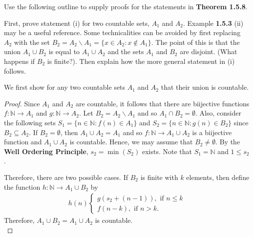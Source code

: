 \documentclass[12pt]{article}
\newcommand{\N}{\mathbb{N}}
\newenvironment{problem}[2][Problem]{\begin{trivlist}
		\item[\hskip \labelsep {\bfseries #1}\hskip \labelsep {\bfseries #2.}]}{\end{trivlist}}
\newenvironment{solution}[2][Solution]{\begin{trivlist}
		\item[\hskip \labelsep {\bfseries #1}\hskip \labelsep {\bfseries #2.}]}{\end{trivlist}}
\begin{document}
	\begin{problem}{1.5.3}
		Use the following outline to supply proofs for the statements in \textbf{Theorem 1.5.8}.
		\begin{enumerate}[label=(\alph*)]
			\item First, prove statement (i) for two countable sets, $A_{1}$ and $A_{2}$. Example \textbf{1.5.3} (ii) may be a useful reference. Some technicalities can be avoided by first replacing $A_{2}$ with the set $B_{2} =A_{2}\backslash A_{1} = \{x\in A_{2}:x\not\in A_{1}\}$. The point of this is that the union $A_{1}\cup B_{2}$ is equal to $A_{1}\cup A_{2}$ and the sets $A_{1}$ and $B_{2}$ are disjoint. (What happens if $B_{2}$ is finite?). Then explain how the more general statement in (i) follows.
			\begin{solution}{(a)}
				We first show for any two countable sets $A_{1}$ and $A_{2}$ that their union is countable.
				\begin{proof}
					Since $A_{1}$ and $A_{2}$ are countable, it follows that there are biijective functions $f:\N \to A_{1}$ and $g:\N \to A_{2}$. Let $B_{2} = A_{2}\backslash A_{1}$ and so $A_{1}\cap B_{2} = \emptyset$. Also, consider the following sets $S_{1} = \{n\in \N: f(n)\in A_{1}\}$ and $S_{2} = \{n\in \N: g(n) \in B_{2}\}$ since $B_{2} \subseteq A_{2}$. If $B_{2} = \emptyset$, then $A_{1}\cup A_{2} = A_{1}$ and so $f:\N \to A_{1}\cup A_{2}$ is a biijective function and $A_{1}\cup A_{2}$ is countable. Hence, we may assume that $B_{2}\neq \emptyset$. By the \textbf{Well Ordering Principle}, $s_{2} = \min (S_{2})$ exists. Note that $S_{1} = \N$ and $1\leq s_{2}$.
					
					Therefore, there are two possible cases. If $B_{2}$ is finite with $k$ elements, then define the function $h:\N \to A_{1}\cup B_{2}$ by
					\begin{align*}
						h(n) \begin{cases}
							g(s_{2}+(n-1)), \text{ if }n\leq k\\
							f(n-k), \text{ if }n>k.
						\end{cases}
					\end{align*}
				Therefore, $A_{1}\cup B_{2} = A_{1}\cup A_{2}$ is countable.\\
				

\end{proof}
\end{solution}
\end{enumerate}
\end{problem}
\end{document}
